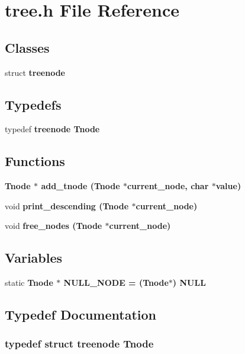 \section{tree.h File Reference}
\label{tree_8h}
\subsection*{Classes}
\begin{CompactItemize}
\item 
struct \bf{treenode}
\end{CompactItemize}
\subsection*{Typedefs}
\begin{CompactItemize}
\item 
typedef \bf{treenode} \bf{Tnode}
\end{CompactItemize}
\subsection*{Functions}
\begin{CompactItemize}
\item 
\bf{Tnode} $\ast$ \bf{add\_\-tnode} (\bf{Tnode} $\ast$current\_\-node, char $\ast$value)
\item 
void \bf{print\_\-descending} (\bf{Tnode} $\ast$current\_\-node)
\item 
void \bf{free\_\-nodes} (\bf{Tnode} $\ast$current\_\-node)
\end{CompactItemize}
\subsection*{Variables}
\begin{CompactItemize}
\item 
static \bf{Tnode} $\ast$ \bf{NULL\_\-NODE} = (\bf{Tnode}$\ast$) NULL
\end{CompactItemize}


\subsection{Typedef Documentation}
\subsubsection{\setlength{\rightskip}{0pt plus 5cm}typedef struct \bf{treenode} \bf{Tnode}}\label{tree_8h_6f68674ef0d88579075e50af1829cb6e}




